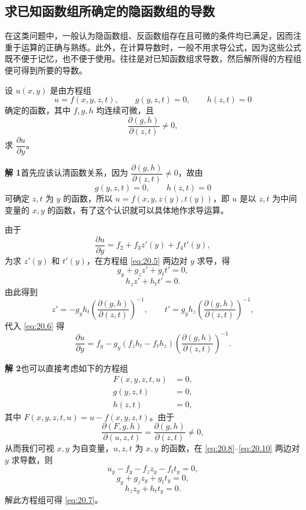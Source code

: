 \subsection{求已知函数组所确定的隐函数组的导数}

在这类问题中，一般认为隐函数组、反函数组存在且可微的条件均已满足，因而注重于运算的正确与熟练。此外，在计算导数时，一般不用求导公式，因为这些公式既不便于记忆，也不便于使用。往往是对已知函数组求导数，然后解所得的方程组便可得到所要的导数。

\begin{xexample}[20.2.2]
设 $u(x,y)$ 是由方程组
\[
  u=f(x,y,z,t),\qquad g(y,z,t)=0,\qquad h(z,t)=0
\]
确定的函数，其中 $f,g,h$ 均连续可微，且
\[
  \frac{\partial(g,h)}{\partial(z,t)}\ne0,
\]
求 $\dfrac{\partial u}{\partial y}$。
\end{xexample}
\begin{xsolution}
\textbf{解 1}\quad 首先应该认清函数关系，因为 $\dfrac{\partial(g,h)}{\partial(z,t)}\ne0$，故由
\begin{equation}
  g(y,z,t)=0,\qquad h(z,t)=0
  \tag{20.5}
  \label{eq:20.5}
\end{equation}
可确定 $z,t$ 为 $y$ 的函数，所以 $u=f(x,y,z(y),t(y))$，即 $u$ 是以 $z,t$ 为中间变量的 $x,y$ 的函数，有了这个认识就可以具体地作求导运算。

由于
\begin{equation}
  \frac{\partial u}{\partial y}=f_2+f_3z'(y)+f_4t'(y),
  \tag{20.6}
  \label{eq:20.6}
\end{equation}
为求 $z'(y)$ 和 $t'(y)$，在方程组 \eqref{eq:20.5} 两边对 $y$ 求导，得
\[
  g_y+g_zz'+g_tt'=0,
\]
\[
  h_zz'+h_tt'=0.
\]
由此得到
\[
  z'=-g_yh_t\left(\frac{\partial(g,h)}{\partial(z,t)}\right)^{-1},
  \qquad
  t'=g_yh_z\left(\frac{\partial(g,h)}{\partial(z,t)}\right)^{-1},
\]
代入 \eqref{eq:20.6} 得
\begin{equation}
  \frac{\partial u}{\partial y}
  =f_y-g_y(f_zh_t-f_th_z)
  \left(\frac{\partial(g,h)}{\partial(z,t)}\right)^{-1}.
  \tag{20.7}
  \label{eq:20.7}
\end{equation}

\textbf{解 2}\quad 也可以直接考虑如下的方程组
\begin{align}
  F(x,y,z,t,u)&=0, \tag{20.8}\label{eq:20.8}\\
  g(y,z,t)&=0, \tag{20.9}\label{eq:20.9}\\
  h(z,t)&=0, \tag{20.10}\label{eq:20.10}
\end{align}
其中 $F(x,y,z,t,u)=u-f(x,y,z,t)$。由于
\[
  \frac{\partial(F,g,h)}{\partial(u,z,t)}
  =\frac{\partial(g,h)}{\partial(z,t)}\ne0,
\]
从而我们可视 $x,y$ 为自变量，$u,z,t$ 为 $x,y$ 的函数，在 \eqref{eq:20.8}--\eqref{eq:20.10} 两边对 $y$ 求导数，则
\[
  u_y-f_y-f_zz_y-f_tt_y=0,
\]
\[
  g_y+g_zz_y+g_tt_y=0,
\]
\[
  h_zz_y+h_tt_y=0.
\]
解此方程组可得 \eqref{eq:20.7}。
\end{xsolution}

